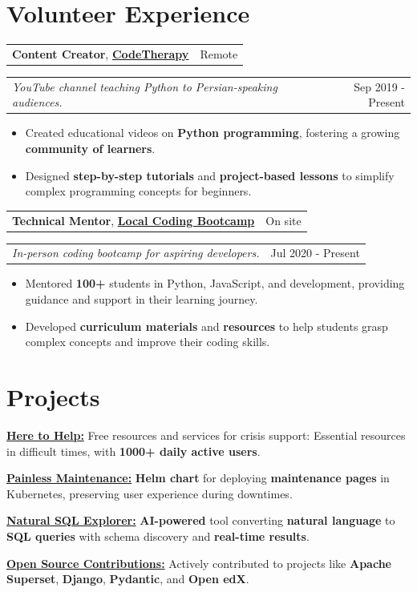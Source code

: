 \documentclass[letterpaper,11pt]{article}
\makeatletter
\newcommand{\resumeItemSimple}[1]{
  \item\small{
    {#1}
  }
}
\newcommand{\resumeSubheadingSimple}[5]{
    \begin{tabular*}{1\textwidth}[t]{l@{\extracolsep{\fill}}r}
      \textbf{#1}, \textbf{\href{#3}{#2}} \space \small#4 & \small#5 \\
    \end{tabular*}
}
\newcommand{\resumeSubSubheading}[2]{
    \begin{tabular*}{1\textwidth}{l@{\extracolsep{\fill}}r}
      \textit{\small#1} & \small #2 \\
    \end{tabular*}\vspace{-1pt}
}
\newcommand{\resumeItemListStart}{\begin{itemize}[leftmargin=0.5cm, itemsep=1pt, parsep=0pt]} %
\newcommand{\resumeItemListEnd}{\end{itemize}}
\newcommand{\projectItem}[3]{
  \href{#3}{\textbf{#1:}} #2 \\ {\vspace{3px}}
}
\makeatother
\begin{document}
\section{Volunteer Experience}

  \resumeSubheadingSimple
  {Content Creator}{CodeTherapy}{https://www.youtube.com/@CodeTherapy}{}{Remote}
    \resumeSubSubheading{YouTube channel teaching Python to Persian-speaking audiences.}{Sep 2019 - Present}
    \resumeItemListStart
      \resumeItemSimple{Created educational videos on \textbf{Python programming}, fostering a growing \textbf{community of learners}.}
      \resumeItemSimple{Designed \textbf{step-by-step tutorials} and \textbf{project-based lessons} to simplify complex programming concepts for beginners.}
    \resumeItemListEnd

  \resumeSubheadingSimple
  {Technical Mentor}{Local Coding Bootcamp}{}{}{On site}
    \resumeSubSubheading{In-person coding bootcamp for aspiring developers.}{Jul 2020 - Present}
    \resumeItemListStart
      \resumeItemSimple{Mentored \textbf{100+} students in Python, JavaScript, and development, providing guidance and support in their learning journey.}
      \resumeItemSimple{Developed \textbf{curriculum materials} and \textbf{resources} to help students grasp complex concepts and improve their coding skills.}
    \resumeItemListEnd

\section{Projects}
  \projectItem{Here to Help}{Free resources and services for crisis support: Essential resources in difficult times, with \textbf{1000+ daily active users}.}{https://github.com/iranian-github/here-to-help}
  \projectItem{Painless Maintenance}{\textbf{Helm chart} for deploying \textbf{maintenance pages} in Kubernetes, preserving user experience during downtimes.}{https://github.com/CodeWithEmad/helm-charts/tree/master/charts/maintenance}
  \projectItem{Natural SQL Explorer}{\textbf{AI-powered} tool converting \textbf{natural language} to \textbf{SQL queries} with schema discovery and \textbf{real-time results}.}{https://github.com/CodeWithEmad/natural-sql-explorer}
  \projectItem{Open Source Contributions}{Actively contributed to projects like \textbf{Apache Superset}, \textbf{Django}, \textbf{Pydantic}, and \textbf{Open edX}.}{https://github.com/codewithemad}
\end{document}

